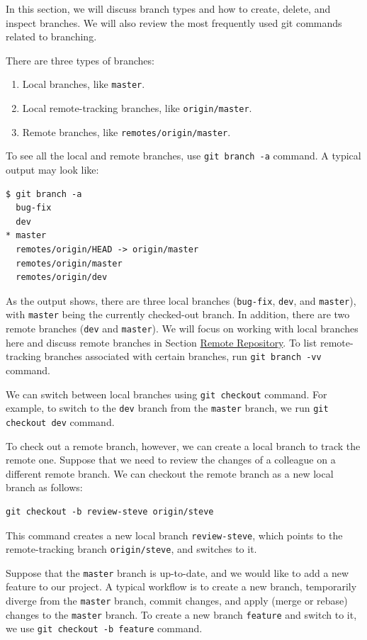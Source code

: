 \documentclass[11pt]{article}
\begin{document}
In this section, we will discuss branch types and how to create, delete, and inspect branches. We will also review the most frequently used git commands related to branching.

There are three types of branches:
\begin{enumerate}
\item Local branches, like \texttt{master}.
\item Local remote-tracking branches, like \texttt{origin/master}.
\item Remote branches, like \texttt{remotes/origin/master}.
\end{enumerate}

To see all the local and remote branches, use \texttt{git branch -a} command. A typical output may look like:
\begin{verbatim}
$ git branch -a
  bug-fix
  dev
* master
  remotes/origin/HEAD -> origin/master
  remotes/origin/master
  remotes/origin/dev
\end{verbatim}
As the output shows, there are three local branches (\texttt{bug-fix}, \texttt{dev}, and \texttt{master}), with \texttt{master} being the currently checked-out branch. In addition, there are two remote branches (\texttt{dev} and \texttt{master}). We will focus on working with local branches here and discuss remote branches in Section \hyperref[orgtarget7]{Remote Repository}. To list remote-tracking branches associated with certain branches, run \texttt{git branch -vv} command.

We can switch between local branches using \texttt{git checkout} command. For example, to switch to the \texttt{dev} branch from the \texttt{master} branch, we run \texttt{git checkout dev} command.

To check out a remote branch, however, we can create a local branch to track the remote one. Suppose that we need to review the changes of a colleague on a different remote branch. We can checkout the remote branch as a new local branch as follows:
\begin{verbatim}
git checkout -b review-steve origin/steve
\end{verbatim}
This command creates a new local branch \texttt{review-steve}, which points to the remote-tracking branch \texttt{origin/steve}, and switches to it.

Suppose that the \texttt{master} branch is up-to-date, and we would like to add a new feature to our project. A typical workflow is to create a new branch, temporarily diverge from the \texttt{master} branch, commit changes, and apply (merge or rebase) changes to the \texttt{master} branch. To create a new branch \texttt{feature} and switch to it, we use \texttt{git checkout -b feature} command.
\end{document}
